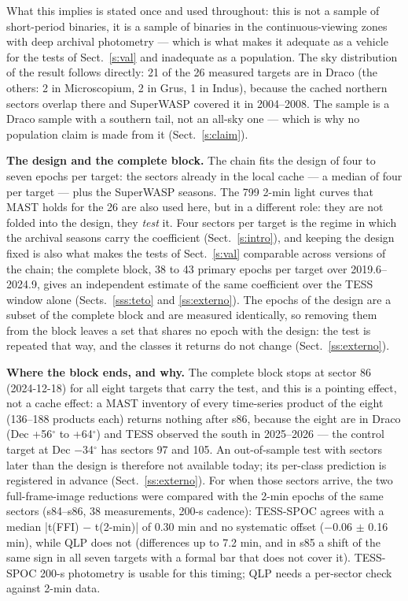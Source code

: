 \documentclass{aa}
\begin{document}
What this implies is stated once and used throughout: this is not a sample of short-period binaries, it is a sample of binaries in the continuous-viewing zones with deep archival photometry --- which is what makes it adequate as a vehicle for the tests of Sect.~\ref{s:val} and inadequate as a population. The sky distribution of the result follows directly: 21 of the 26 measured targets are in Draco (the others: 2 in Microscopium, 2 in Grus, 1 in Indus), because the cached northern sectors overlap there and SuperWASP covered it in 2004--2008. The sample is a Draco sample with a southern tail, not an all-sky one --- which is why no population claim is made from it (Sect.~\ref{s:claim}).

\textbf{The design and the complete block.} The chain fits the design of four to seven epochs per target: the sectors already in the local cache --- a median of four per target --- plus the SuperWASP seasons. The 799 2-min light curves that MAST holds for the 26 are also used here, but in a different role: they are not folded into the design, they \textit{test} it. Four sectors per target is the regime in which the archival seasons carry the coefficient (Sect.~\ref{s:intro}), and keeping the design fixed is also what makes the tests of Sect.~\ref{s:val} comparable across versions of the chain; the complete block, 38 to 43 primary epochs per target over 2019.6--2024.9, gives an independent estimate of the same coefficient over the TESS window alone (Sects.~\ref{sss:teto} and \ref{ss:externo}). The epochs of the design are a subset of the complete block and are measured identically, so removing them from the block leaves a set that shares no epoch with the design: the test is repeated that way, and the classes it returns do not change (Sect.~\ref{ss:externo}).

\textbf{Where the block ends, and why.} The complete block stops at sector 86 (2024-12-18) for all eight targets that carry the test, and this is a pointing effect, not a cache effect: a MAST inventory of every time-series product of the eight (136--188 products each) returns nothing after s86, because the eight are in Draco (Dec +56$^\circ$ to +64$^\circ$) and TESS observed the south in 2025--2026 --- the control target at Dec $-$34$^\circ$ has sectors 97 and 105. An out-of-sample test with sectors later than the design is therefore not available today; its per-class prediction is registered in advance (Sect.~\ref{ss:externo}). For when those sectors arrive, the two full-frame-image reductions were compared with the 2-min epochs of the same sectors (s84--s86, 38 measurements, 200-s cadence): TESS-SPOC agrees with a median |t(FFI) $-$ t(2-min)| of 0.30 min and no systematic offset ($-$0.06 $\pm$ 0.16 min), while QLP does not (differences up to 7.2 min, and in s85 a shift of the same sign in all seven targets with a formal bar that does not cover it). TESS-SPOC 200-s photometry is usable for this timing; QLP needs a per-sector check against 2-min data.
\end{document}
